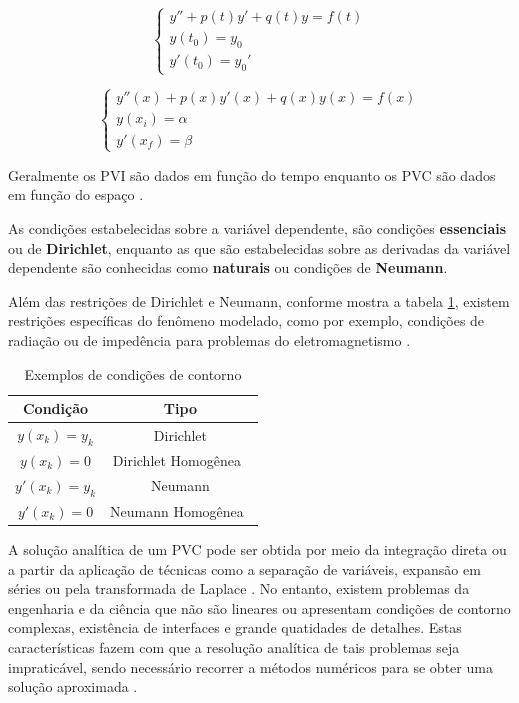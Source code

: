 \documentclass[
    12pt,               %
    openright,          %
    oneside,
    a4paper,            %
    english,            %
    french,             %
    spanish,            %
    brazil              %
    ]{abntex2}
\begin{document}
\begin{equation}
    \label{eq:pvi}
    \begin{cases}
        y'' + p(t)y' + q(t)y = f(t) \\
        y(t_0) = y_0 \\
        y'(t_0) = y_0'
    \end{cases}
\end{equation}


\begin{equation}
    \label{eq:pvc}
    \begin{cases}
        y''(x) + p(x)y'(x) + q(x)y(x) = f(x) \\
        y(x_i) = \alpha \\
        y'(x_f) = \beta
    \end{cases}
\end{equation}

Geralmente os PVI são dados em função do tempo enquanto os PVC são dados em função do espaço \cite[p. 447]{boyceDiprima}.

As condições estabelecidas sobre a variável dependente, são condições \textbf{essenciais} ou de \textbf{Dirichlet}, enquanto as que são estabelecidas sobre as derivadas da variável dependente são  conhecidas como \textbf{naturais} ou condições de \textbf{Neumann}.

Além das restrições de Dirichlet e Neumann, conforme mostra a tabela \ref{tab:cond}, existem restrições específicas do fenômeno modelado, como por exemplo, condições de radiação ou de impedência para problemas do eletromagnetismo \cite[p. 20]{jin}. 


\begin{table}   
    \centering
    \begin{tabular}{|c|c|}  
        \hline
        \textbf{Condição} 
        & \textbf{Tipo} \\  
        \hline
        $y(x_k) = y_k $ 
        & Dirichlet \\
        \hline
        $y(x_k) = 0$
        & Dirichlet Homogênea\  \\
        \hline
        $y'(x_k) = y_k$
        & Neumann \\
        \hline
        $y'(x_k) = 0$
        & Neumann Homogênea\  \\
        \hline
    \end{tabular}
    \caption{Exemplos de condições de contorno}
    \label{tab:cond}
\end{table}


A solução analítica de um PVC pode ser obtida por meio da integração direta ou a partir da aplicação de técnicas como a separação de variáveis, expansão em séries ou pela transformada de Laplace \cite[p. 31, 191, 239]{boyceDiprima} \cite[p. 59, 263, 355]{powers}.
No entanto, existem problemas da engenharia e da ciência que não são lineares ou apresentam  condições de contorno complexas, existência de interfaces e grande quatidades de detalhes.  Estas características fazem com que a resolução analítica de tais problemas seja impraticável, sendo necessário recorrer a métodos numéricos para se obter uma solução aproximada \cite[p. 447]{boyceDiprima}  \cite[p.397]{powers}.
\end{document}
